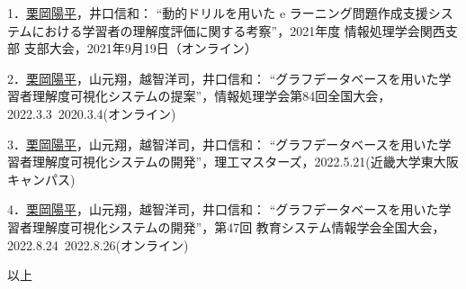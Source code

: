 \begin{flushleft}
    1．\underline{栗岡陽平}，井口信和： “動的ドリルを用いた e ラーニング問題作成支援システムにおける学習者の理解度評価に関する考察”，2021年度 情報処理学会関西支部 支部大会，2021年9月19日（オンライン）
    \end{flushleft}
    
    \begin{flushleft}
    2．\underline{栗岡陽平}，山元翔，越智洋司，井口信和： “グラフデータベースを用いた学習者理解度可視化システムの提案”，情報処理学会第84回全国大会，2022.3.3~2020.3.4(オンライン)
    \end{flushleft}

    \begin{flushleft}
    3．\underline{栗岡陽平}，山元翔，越智洋司，井口信和： “グラフデータベースを用いた学習者理解度可視化システムの開発”，理工マスターズ，2022.5.21(近畿大学東大阪キャンパス)
    \end{flushleft}

    \begin{flushleft}
    4．\underline{栗岡陽平}，山元翔，越智洋司，井口信和： “グラフデータベースを用いた学習者理解度可視化システムの開発”，第47回 教育システム情報学会全国大会，2022.8.24~2022.8.26(オンライン)
    \end{flushleft}

    \begin{flushright}
    以上
    \end{flushright}